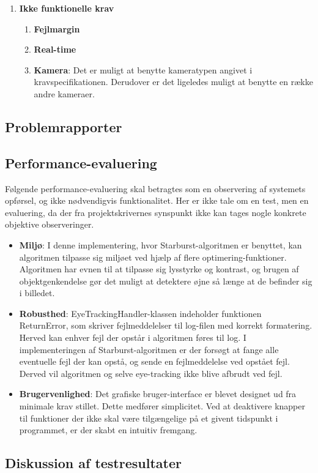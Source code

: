 \documentclass[rapport.tex]{subfiles}
\begin{document}
\begin{enumerate}
\begin{enumerate}
\begin{enumerate}
				Der er testet om programmet kan udtrække de korrekte værdier fra en præference-fil, og derefter skrive værdierne til de korrekte bokse. En præference-fil med korrekt format og kendt indhold er skrevet og forsøgt læst ind. Undtagelsesforløbet er testet ved at have en præference-fil med forkert format. Dette forløb er til for at teste verificeringsdelen af klassen SessionHandler. Denne test case er acceptteret.
				\item \textbf{Use case 7: Indlæs rå data}:
				Denne test case er ikke længere relevant og derfor ikke testet. Se afsnit \ref{probrapport}.
			\end{enumerate}
		\end{enumerate}
		\item \textbf{Ikke funktionelle krav}
		\begin{enumerate}
			\item \textbf{Fejlmargin}
			\item \textbf{Real-time}
			\item \textbf{Kamera}: Det er muligt at benytte kameratypen angivet i kravspecifikationen. Derudover er det ligeledes muligt at benytte en række andre kameraer.
		\end{enumerate}
	\end{enumerate}
	\subsection{Problemrapporter}
	\label{probrapport}
	\subsection{Performance-evaluering}
	Følgende performance-evaluering skal betragtes som en observering af systemets opførsel, og ikke nødvendigvis funktionalitet. Her er ikke tale om en test, men en evaluering, da der fra projektskrivernes synspunkt ikke kan tages nogle konkrete objektive observeringer. 
	\begin{itemize}
		\item \textbf{Miljø}: I denne implementering, hvor Starburst-algoritmen er benyttet, kan algoritmen tilpasse sig miljøet ved hjælp af flere optimering-funktioner. Algoritmen har evnen til at tilpasse sig lysstyrke og kontrast, og brugen af objektgenkendelse gør det muligt at detektere øjne så længe at de befinder sig i billedet. 
		\item \textbf{Robusthed}: EyeTrackingHandler-klassen indeholder funktionen ReturnError, som skriver fejlmeddelelser til log-filen med korrekt formatering. Herved kan enhver fejl der opstår i algoritmen føres til log. I implementeringen af Starburst-algoritmen er der forsøgt at fange alle eventuelle fejl der kan opstå, og sende en fejlmeddelelse ved opstået fejl. Derved vil algoritmen og selve eye-tracking ikke blive afbrudt ved fejl. 
		\item \textbf{Brugervenlighed}: Det grafiske bruger-interface er blevet designet ud fra minimale krav stillet. Dette medfører simplicitet. Ved at deaktivere knapper til funktioner der ikke skal være tilgængelige på et givent tidspunkt i programmet, er der skabt en intuitiv fremgang.
	\end{itemize}
	\subsection{Diskussion af testresultater}
		
\end{document}
